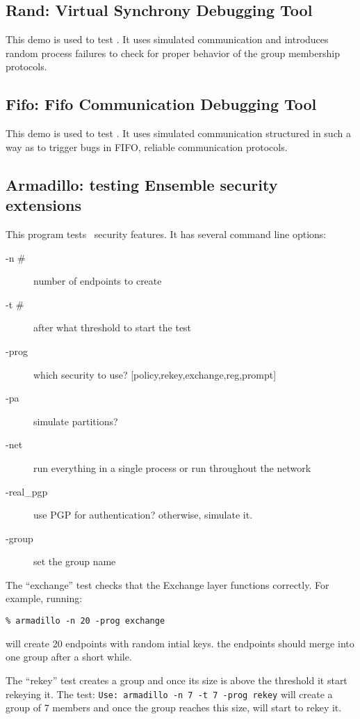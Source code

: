 \subsection{Rand: Virtual Synchrony Debugging Tool}
This demo is used to test \ensemble.  It uses simulated communication and
introduces random process failures to check for proper behavior of the group
membership protocols.

\subsection{Fifo: Fifo Communication Debugging Tool}
This demo is used to test \ensemble.  It uses simulated communication
structured in such a way as to trigger bugs in FIFO, reliable communication
protocols.

\subsection{Armadillo: testing Ensemble security extensions}
This program tests \ensemble\ security features. It has several
command line options:
\begin{description}
\item[-n \#]  number of endpoints to create
\item[-t \#]  after what threshold to start the test
\item[-prog] which security to use? [policy,rekey,exchange,reg,prompt]
\item[-pa]   simulate partitions? 
\item[-net]  run everything in a single process or run throughout the  network
\item[-real\_pgp]  use PGP for authentication? otherwise, simulate it.
\item[-group]    set the group name
\end{description}

The ``exchange'' test checks that the Exchange layer functions
correctly. For example, running:
\begin{verbatim}
% armadillo -n 20 -prog exchange
\end{verbatim}
will create 20 endpoints with random intial keys. the endpoints should
merge into one group after a short while.

The ``rekey'' test creates a group and once its size is above the
threshold it start rekeying it. The test: {\tt Use: armadillo -n 7 -t
7 -prog rekey} will create a group of 7 members and once the group
reaches this size, will start to rekey it.
		
